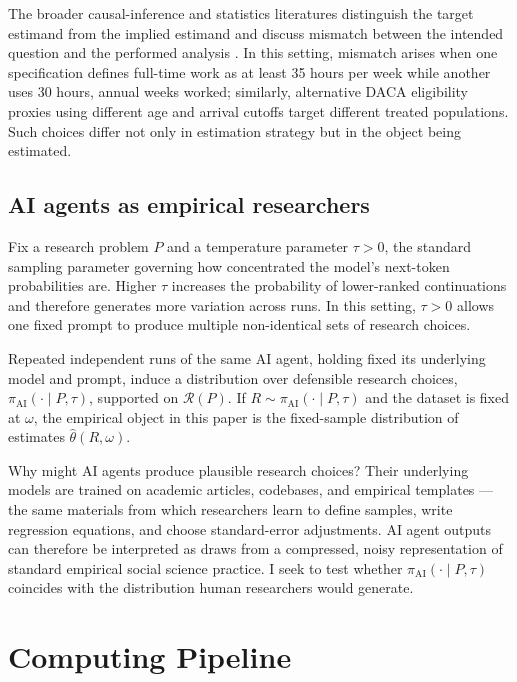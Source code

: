 \documentclass[12pt]{article}
\newcommand{\R}{\mathcal{R}}
\begin{document}
The broader causal-inference and statistics literatures distinguish the target estimand from the implied estimand and discuss mismatch between the intended question and the performed analysis \citep{blair2019declaring, choi2023question, chang2024alignment, barnard2026mismatch}. In this setting, mismatch arises when one specification defines full-time work as at least 35 hours per week while another uses 30 hours, annual weeks worked; similarly, alternative DACA eligibility proxies using different age and arrival cutoffs target different treated populations. Such choices differ not only in estimation strategy but in the object being estimated.

\subsection{AI agents as empirical researchers}
\label{sec:framework_llm}

Fix a research problem $P$ and a temperature parameter $\tau>0$, the standard sampling parameter governing how concentrated the model's next-token probabilities are. Higher $\tau$ increases the probability of lower-ranked continuations and therefore generates more variation across runs. In this setting, $\tau>0$ allows one fixed prompt to produce multiple non-identical sets of research choices.

Repeated independent runs of the same AI agent, holding fixed its underlying model and prompt, induce a distribution over defensible research choices, $\pi_{\mathrm{AI}}(\cdot\mid P,\tau)$, supported on $\R(P)$. If $R \sim \pi_{\mathrm{AI}}(\cdot\mid P,\tau)$ and the dataset is fixed at $\omega$, the empirical object in this paper is the fixed-sample distribution of estimates $\hat\theta(R,\omega)$.

Why might AI agents produce plausible research choices? Their underlying models are trained on academic articles, codebases, and empirical templates \citep{gao2020pile, chen2021codex}---the same materials from which researchers learn to define samples, write regression equations, and choose standard-error adjustments. AI agent outputs can therefore be interpreted as draws from a compressed, noisy representation of standard empirical social science practice. I seek to test whether $\pi_{\mathrm{AI}}(\cdot\mid P,\tau)$ coincides with the distribution human researchers would generate.

\section{Computing Pipeline}
\label{sec:software}
\end{document}
